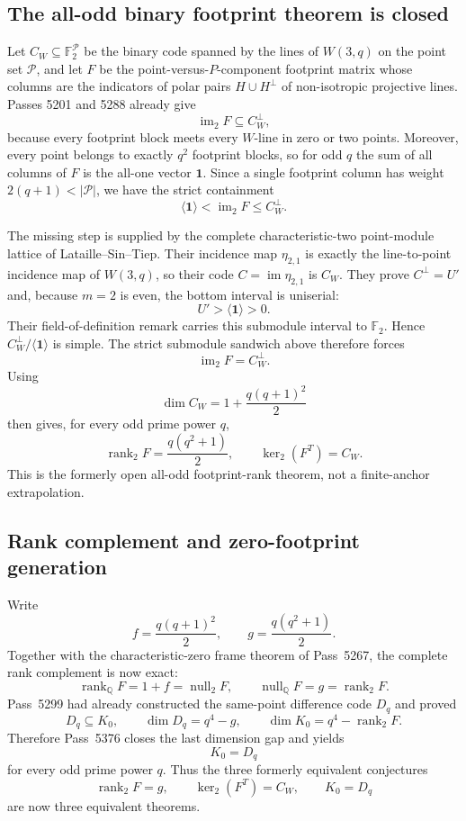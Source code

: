 \subsection{The all-odd binary footprint theorem is closed}
\label{sec:pass5376-footprint-rank-closed}

Let $C_W\subseteq\mathbb F_2^{\mathcal P}$ be the binary code spanned by the
lines of $W(3,q)$ on the point set $\mathcal P$, and let $F$ be the
point-versus-$P$-component footprint matrix whose columns are the indicators of
polar pairs $H\cup H^\perp$ of non-isotropic projective lines.  Passes
5201 and 5288 already give
\[
 \operatorname{im}_2F\subseteq C_W^\perp,
\]
because every footprint block meets every $W$-line in zero or two points.
Moreover, every point belongs to exactly $q^2$ footprint blocks, so for odd $q$
the sum of all columns of $F$ is the all-one vector $\mathbf 1$.  Since a
single footprint column has weight $2(q+1)<|\mathcal P|$, we have the strict
containment
\[
 \langle\mathbf1\rangle<\operatorname{im}_2F\le C_W^\perp.
\]

The missing step is supplied by the complete characteristic-two point-module
lattice of Lataille--Sin--Tiep.  Their incidence map $\eta_{2,1}$ is exactly
the line-to-point incidence map of $W(3,q)$, so their code
$C=\operatorname{im}\eta_{2,1}$ is $C_W$.  They prove
$C^\perp=U'$ and, because $m=2$ is even, the bottom interval is uniserial:
\[
 \boxed{U'>\langle\mathbf1\rangle>0.}
\]
Their field-of-definition remark carries this submodule interval to
$\mathbb F_2$.  Hence $C_W^\perp/\langle\mathbf1\rangle$ is simple.  The strict
submodule sandwich above therefore forces
\[
 \boxed{\operatorname{im}_2F=C_W^\perp.}
\]
Using
\[
 \dim C_W=1+\frac{q(q+1)^2}{2}
\]
then gives, for every odd prime power $q$,
\[
 \boxed{
 \operatorname{rank}_2F=\frac{q(q^2+1)}2,
 \qquad
 \ker_2(F^T)=C_W.
 }
\]
This is the formerly open all-odd footprint-rank theorem, not a finite-anchor
extrapolation.

\subsection{Rank complement and zero-footprint generation}
\label{sec:pass5377-rank-complement-closed}

Write
\[
 f=\frac{q(q+1)^2}{2},
 \qquad
 g=\frac{q(q^2+1)}2.
\]
Together with the characteristic-zero frame theorem of Pass~5267, the complete
rank complement is now exact:
\[
 \boxed{
 \operatorname{rank}_{\mathbb Q}F=1+f=\operatorname{null}_{2}F,
 \qquad
 \operatorname{null}_{\mathbb Q}F=g=\operatorname{rank}_{2}F.
 }
\]
Pass~5299 had already constructed the same-point difference code $D_q$ and
proved
\[
 D_q\subseteq K_0,
 \qquad
 \dim D_q=q^4-g,
 \qquad
 \dim K_0=q^4-\operatorname{rank}_2F.
\]
Therefore Pass~5376 closes the last dimension gap and yields
\[
 \boxed{K_0=D_q}
\]
for every odd prime power $q$.  Thus the three formerly equivalent conjectures
\[
 \operatorname{rank}_2F=g,
 \qquad
 \ker_2(F^T)=C_W,
 \qquad
 K_0=D_q
\]
are now three equivalent theorems.

